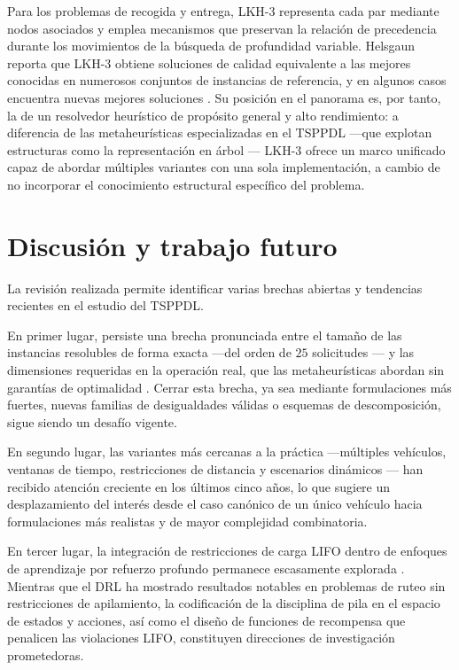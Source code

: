 \documentclass[conference]{IEEEtran}
\begin{document}
Para los problemas de recogida y entrega, LKH-3 representa cada par mediante nodos asociados y emplea mecanismos que preservan la relación de precedencia durante los movimientos de la búsqueda de profundidad variable. Helsgaun reporta que LKH-3 obtiene soluciones de calidad equivalente a las mejores conocidas en numerosos conjuntos de instancias de referencia, y en algunos casos encuentra nuevas mejores soluciones \cite{helsgaun2017}. Su posición en el panorama es, por tanto, la de un resolvedor heurístico de propósito general y alto rendimiento: a diferencia de las metaheurísticas especializadas en el TSPPDL —que explotan estructuras como la representación en árbol \cite{li2011}— LKH-3 ofrece un marco unificado capaz de abordar múltiples variantes con una sola implementación, a cambio de no incorporar el conocimiento estructural específico del problema.

\section{Discusión y trabajo futuro}\label{sec:disc}
La revisión realizada permite identificar varias brechas abiertas y tendencias recientes en el estudio del TSPPDL.

En primer lugar, persiste una brecha pronunciada entre el tamaño de las instancias resolubles de forma exacta —del orden de $25$ solicitudes \cite{cordeau2010}— y las dimensiones requeridas en la operación real, que las metaheurísticas abordan sin garantías de optimalidad \cite{li2011,cheang2012}. Cerrar esta brecha, ya sea mediante formulaciones más fuertes, nuevas familias de desigualdades válidas o esquemas de descomposición, sigue siendo un desafío vigente.

En segundo lugar, las variantes más cercanas a la práctica —múltiples vehículos, ventanas de tiempo, restricciones de distancia y escenarios dinámicos \cite{cheang2012,liu2019,du2023}— han recibido atención creciente en los últimos cinco años, lo que sugiere un desplazamiento del interés desde el caso canónico de un único vehículo hacia formulaciones más realistas y de mayor complejidad combinatoria.

En tercer lugar, la integración de restricciones de carga LIFO dentro de enfoques de aprendizaje por refuerzo profundo permanece escasamente explorada \cite{zong2025,elamrani2025}. Mientras que el DRL ha mostrado resultados notables en problemas de ruteo sin restricciones de apilamiento, la codificación de la disciplina de pila en el espacio de estados y acciones, así como el diseño de funciones de recompensa que penalicen las violaciones LIFO, constituyen direcciones de investigación prometedoras.
\end{document}
